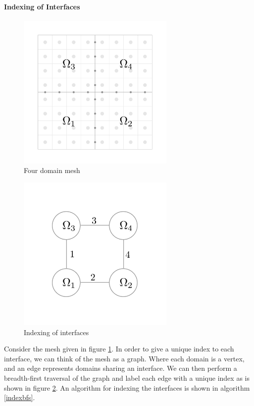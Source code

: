 \documentclass[12pt]{article}
\begin{document}
\paragraph{Indexing of Interfaces}
\begin{figure}
    \centering
    \includegraphics[width=3in]{images/4domain.pdf}
    \caption{Four domain mesh}
    \label{fourdomain}
\end{figure}
\begin{figure}
    \centering
    \includegraphics[width=3in]{images/4domaingraph.pdf}
    \caption{Indexing of interfaces}
    \label{fourgraph}
\end{figure}
Consider the mesh given in figure \ref{fourdomain}. In order to give a unique index to each
interface, we can think of the mesh as a graph. Where each domain is a vertex, and an edge 
represents
domains sharing an interface. We can then perform a breadth-first traversal of the graph and label
each edge with a unique index as is shown in figure \ref{fourgraph}. An algorithm for indexing the
interfaces is shown in algorithm \ref{indexbfs}. 
\end{document}
